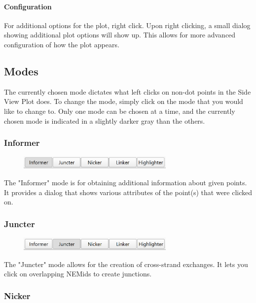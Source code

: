 \documentclass[titlepage]{article}
\begin{document}
	\paragraph{Configuration}
	For additional options for the plot, right click. Upon right clicking, a small dialog showing additional plot options will show up. This allows for more advanced configuration of how the plot appears.
	
	\subsection{Modes}
	The currently chosen mode dictates what left clicks on non-dot points in the Side View Plot does. To change the mode, simply click on the mode that you would like to change to. Only one mode can be chosen at a time, and the currently chosen mode is indicated in a slightly darker gray than the others.
	
	\subsubsection{Informer}
	
	\begin{figure}[h]
		\centering
		\includegraphics[width=3in]{"informer-activated.png"}
		\label{fig:informer-activated}
	\end{figure}

	The "Informer" mode is for obtaining additional information about given points. It provides a dialog that shows various attributes of the point(s) that were clicked on.

	\subsubsection{Juncter}

	\begin{figure}[h]
		\centering
		\includegraphics[width=3in]{"juncter-activated.png"}
		\label{fig:juncter-activated}
	\end{figure}

	The "Juncter" mode allows for the creation of cross-strand exchanges. It lets you click on overlapping NEMids to create junctions.

	\subsubsection{Nicker}
\end{document}
